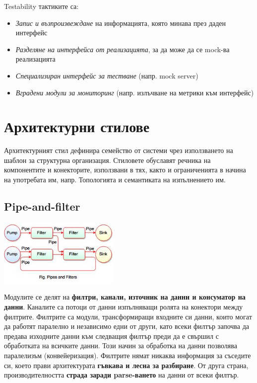 \documentclass[fleqn,12pt]{article}
\begin{document}
Testability тактиките са:
\begin{itemize}
    \item \textit{Запис и възпроизвеждане} на информацията, която минава през даден интерфейс
    \item \textit{Разделяне на интерфейса от реализацията}, за да може да се mock-ва реализацията
    \item \textit{Специализиран интерфейс за тестване} (напр. mock server)
    \item \textit{Вградени модули за мониторинг} (напр. излъчване на метрики към интерфейс)
\end{itemize}

\section{Архитектурни стилове}

Архитектурният стил дефинира семейство от системи чрез използването на
шаблон за структурна организация.
Стиловете обуславят речника на компонентите и конекторите, използвани в тях, както и ограниченията в начина на употребата им, напр. Топологията и семантиката на изпълнението им.

\subsection{Pipe-and-filter}

\begin{center} \includegraphics[width=220px]{pipe_and_filter.jpg} \end{center}

Модулите се делят на \textbf{филтри, канали, източник на данни и консуматор на данни}.
Каналите са потоци от данни изпълняващи ролята на конектори между филтрите.
Филтрите са модули, трансформиращи входните си данни, които могат да работят паралелно и независимо едни от други, като всеки филтър започва да предава изходните данни към следващия филтър преди да е свършил с обработката на всичките данни.
Този начин за обработка на данни позволява паралелизъм (конвейеризация).
\bigbreak
Филтрите нямат никаква информация за съседите си, което прави архитектурата \textbf{гъвкава и лесна за разбиране}.
От друга страна, производителността \textbf{страда заради parse-ването} на данни от всеки филтър.
\end{document}
